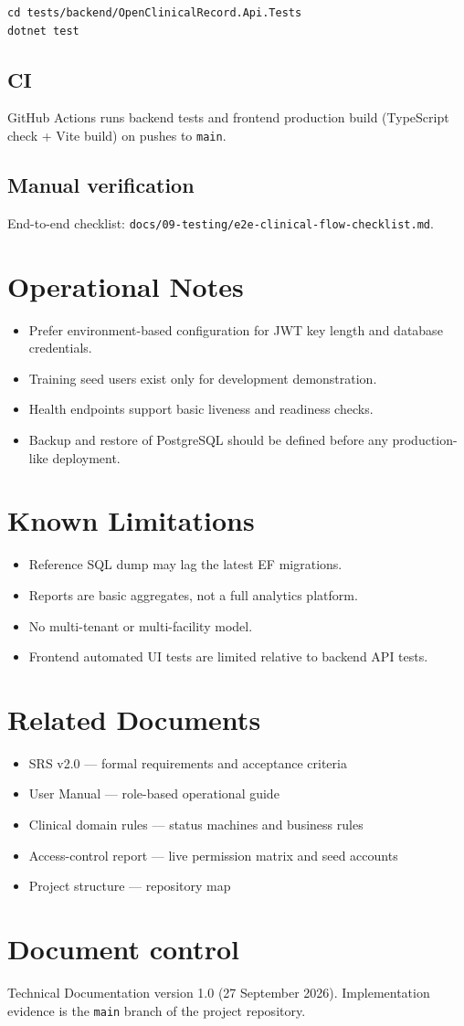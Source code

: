 \documentclass[11pt,a4paper]{article}
\begin{document}
\begin{lstlisting}
cd tests/backend/OpenClinicalRecord.Api.Tests
dotnet test
\end{lstlisting}

\subsection{CI}
GitHub Actions runs backend tests and frontend production build (TypeScript check + Vite build) on pushes to \texttt{main}.

\subsection{Manual verification}
End-to-end checklist: \texttt{docs/09-testing/e2e-clinical-flow-checklist.md}.

\section{Operational Notes}

\begin{itemize}
  \item Prefer environment-based configuration for JWT key length and database credentials.
  \item Training seed users exist only for development demonstration.
  \item Health endpoints support basic liveness and readiness checks.
  \item Backup and restore of PostgreSQL should be defined before any production-like deployment.
\end{itemize}

\section{Known Limitations}
\begin{itemize}
  \item Reference SQL dump may lag the latest EF migrations.
  \item Reports are basic aggregates, not a full analytics platform.
  \item No multi-tenant or multi-facility model.
  \item Frontend automated UI tests are limited relative to backend API tests.
\end{itemize}

\section{Related Documents}
\begin{itemize}
  \item SRS v2.0 --- formal requirements and acceptance criteria
  \item User Manual --- role-based operational guide
  \item Clinical domain rules --- status machines and business rules
  \item Access-control report --- live permission matrix and seed accounts
  \item Project structure --- repository map
\end{itemize}

\section*{Document control}
Technical Documentation version 1.0 (27 September 2026). Implementation evidence is the \texttt{main} branch of the project repository.
\end{document}
